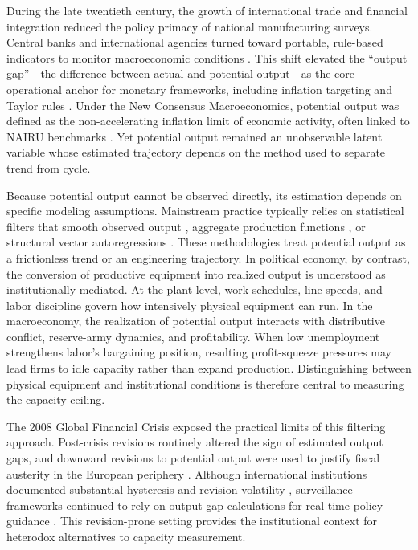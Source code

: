 During the late twentieth century, the growth of international trade and financial integration reduced the policy primacy of national manufacturing surveys. Central banks and international agencies turned toward portable, rule-based indicators to monitor macroeconomic conditions \citep{Jessop2002, Jessop2003, Konings2007}. This shift elevated the ``output gap''---the difference between actual and potential output---as the core operational anchor for monetary frameworks, including inflation targeting and Taylor rules \citep{Taylor1993, Johnson2024}. Under the New Consensus Macroeconomics, potential output was defined as the non-accelerating inflation limit of economic activity, often linked to NAIRU benchmarks \citep{SaadFilho2018}. Yet potential output remained an unobservable latent variable whose estimated trajectory depends on the method used to separate trend from cycle.

Because potential output cannot be observed directly, its estimation depends on specific modeling assumptions. Mainstream practice typically relies on statistical filters that smooth observed output \citep{HodrickPrescott1997, BaxterKing1999, BeveridgeNelson1981, Hamilton2018}, aggregate production functions \citep{CBO2004PotentialGDP, Alichi2015}, or structural vector autoregressions \citep{BlanchardQuah1989}. These methodologies treat potential output as a frictionless trend or an engineering trajectory. In political economy, by contrast, the conversion of productive equipment into realized output is understood as institutionally mediated. At the plant level, work schedules, line speeds, and labor discipline govern how intensively physical equipment can run. In the macroeconomy, the realization of potential output interacts with distributive conflict, reserve-army dynamics, and profitability. When low unemployment strengthens labor's bargaining position, resulting profit-squeeze pressures may lead firms to idle capacity rather than expand production. Distinguishing between physical equipment and institutional conditions is therefore central to measuring the capacity ceiling.

The 2008 Global Financial Crisis exposed the practical limits of this filtering approach. Post-crisis revisions routinely altered the sign of estimated output gaps, and downward revisions to potential output were used to justify fiscal austerity in the European periphery \citep{Heimberger2017, Heimberger2020}. Although international institutions documented substantial hysteresis and revision volatility \citep{CerraSaxena2017, CerraFatasSaxena2023}, surveillance frameworks continued to rely on output-gap calculations for real-time policy guidance \citep{AastveitTrovik2014, Foster2024}. This revision-prone setting provides the institutional context for heterodox alternatives to capacity measurement.

